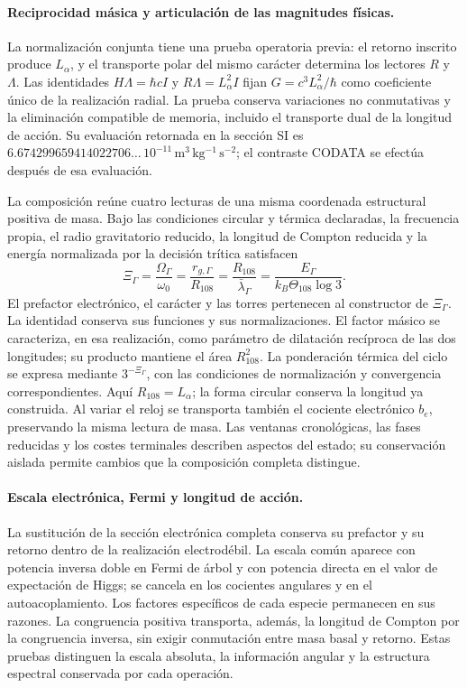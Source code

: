 \paragraph{Reciprocidad másica y articulación de las magnitudes físicas.}
La normalización conjunta tiene una prueba operatoria previa:
el retorno inscrito produce $L_\alpha$, y el transporte polar del mismo
carácter determina los lectores $R$ y $\Lambda$.
Las identidades $H\Lambda=\hbar cI$ y $R\Lambda=L_\alpha^2I$ fijan
$G=c^3L_\alpha^2/\hbar$ como coeficiente único de la realización radial.
La prueba conserva variaciones no conmutativas y la eliminación compatible
de memoria, incluido el transporte dual de la longitud de acción.
Su evaluación retornada en la sección SI es
$6.674299659414022706\ldots\,10^{-11}\,\mathrm{m^3\,kg^{-1}\,s^{-2}}$;
el contraste CODATA se efectúa después de esa evaluación.

La composición reúne cuatro lecturas de una misma coordenada
estructural positiva de masa. Bajo las condiciones circular y térmica
declaradas, la frecuencia propia, el radio gravitatorio reducido, la
longitud de Compton reducida y la energía normalizada por la decisión
trítica satisfacen
\[
 \Xi_\Gamma=
 \frac{\Omega_\Gamma}{\omega_0}
 =\frac{r_{g,\Gamma}}{R_{108}}
 =\frac{R_{108}}{\bar\lambda_\Gamma}
 =\frac{E_\Gamma}{k_B\Theta_{108}\log3}.
\]
El prefactor electrónico, el carácter y las torres pertenecen al
constructor de \(\Xi_\Gamma\). La identidad conserva sus funciones y
sus normalizaciones. El factor másico se caracteriza, en esa realización,
como parámetro de dilatación recíproca de las dos longitudes; su producto
mantiene el área \(R_{108}^2\). La ponderación térmica del ciclo se
expresa mediante \(3^{-\Xi_\Gamma}\), con las condiciones de
normalización y convergencia correspondientes.
Aquí $R_{108}=L_\alpha$; la forma circular conserva la longitud ya
construida. Al variar el reloj se transporta también el cociente electrónico
$b_e$, preservando la misma lectura de masa. Las ventanas cronológicas,
las fases reducidas y los costes terminales describen aspectos del estado;
su conservación aislada permite cambios que la composición completa distingue.

\paragraph{Escala electrónica, Fermi y longitud de acción.}
La sustitución de la sección electrónica completa conserva su prefactor
y su retorno dentro de la realización electrodébil. La escala común
aparece con potencia inversa doble en Fermi de árbol y con potencia
directa en el valor de expectación de Higgs; se cancela en los
cocientes angulares y en el autoacoplamiento. Los factores específicos
de cada especie permanecen en sus razones. La congruencia positiva
transporta, además, la longitud de Compton por la congruencia inversa,
sin exigir conmutación entre masa basal y retorno. Estas pruebas
distinguen la escala absoluta, la información angular y la estructura
espectral conservada por cada operación.

